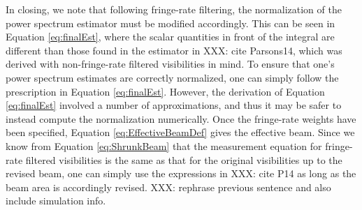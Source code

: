 \documentclass[twocolumn,apj,numberedappendix]{emulateapj}
\begin{document}
In closing, we note that following fringe-rate filtering, the normalization of the power spectrum estimator must be modified accordingly. This can be seen in Equation \eqref{eq:finalEst}, where the scalar quantities in front of the integral are different than those found in the estimator in XXX: cite Parsons14, which was derived with non-fringe-rate filtered visibilities in mind. To ensure that one's power spectrum estimates are correctly normalized, one can simply follow the prescription in Equation \eqref{eq:finalEst}. However, the derivation of Equation \eqref{eq:finalEst} involved a number of approximations, and thus it may be safer to instead compute the normalization numerically. Once the fringe-rate weights have been specified, Equation \eqref{eq:EffectiveBeamDef} gives the effective beam. Since we know from Equation \eqref{eq:ShrunkBeam} that the measurement equation for fringe-rate filtered visibilities is the same as that for the original visibilities up to the revised beam, one can simply use the expressions in XXX: cite P14 as long as the beam area is accordingly revised. XXX: rephrase previous sentence and also include simulation info.
%
%
\end{document}
